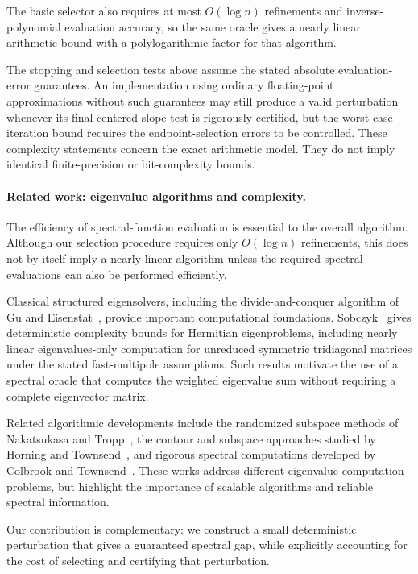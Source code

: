 \documentclass[10pt,a4paper]{article}
\begin{document}
The basic selector also requires at most
$O(\log n)$ refinements and inverse-polynomial
evaluation accuracy, so the same oracle gives
a nearly linear arithmetic bound with a
polylogarithmic factor for that algorithm.

The stopping and selection tests above assume
the stated absolute evaluation-error guarantees.
An implementation using ordinary floating-point
approximations without such guarantees may still
produce a valid perturbation whenever its final
centered-slope test is rigorously certified, but
the worst-case iteration bound requires the
endpoint-selection errors to be controlled.
These complexity statements concern the exact
arithmetic model. They do not imply identical
finite-precision or bit-complexity bounds.


\paragraph{Related work: eigenvalue algorithms and complexity.}
The efficiency of spectral-function evaluation
is essential to the overall algorithm.
Although our selection procedure requires
only $O(\log n)$ refinements, this does not
by itself imply a nearly linear algorithm
unless the required spectral evaluations
can also be performed efficiently.

Classical structured eigensolvers, including
the divide-and-conquer algorithm of Gu and
Eisenstat~\cite{GuEisenstat1995}, provide
important computational foundations.
Sobczyk~\cite{Sobczyk2025} gives deterministic
complexity bounds for Hermitian eigenproblems,
including nearly linear eigenvalues-only
computation for unreduced symmetric tridiagonal matrices
under the stated fast-multipole assumptions.
Such results motivate the use of a spectral
oracle that computes the weighted eigenvalue
sum without requiring a complete eigenvector
matrix.

Related algorithmic developments include the
randomized subspace methods of Nakatsukasa and
Tropp~\cite{NakatsukasaTropp2024}, the contour
and subspace approaches studied by Horning and
Townsend~\cite{HorningTownsend2020}, and rigorous
spectral computations developed by Colbrook
and Townsend~\cite{ColbrookTownsend2024,
ColbrookTownsend2025}. These works address
different eigenvalue-computation problems, but
highlight the importance of scalable algorithms
and reliable spectral information.

Our contribution is complementary: we construct
a small deterministic perturbation that gives
a guaranteed spectral gap, while explicitly
accounting for the cost of selecting and
certifying that perturbation.
\end{document}
